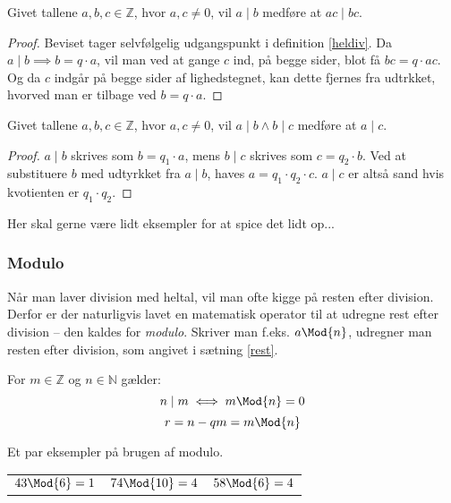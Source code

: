 \begin{sent}
    Givet tallene \(a, b, c \in \mathbb{Z}\), hvor \(a, c \neq 0\), vil \(a \mid b\) medføre at \(a c \mid b c\).
\end{sent}

\begin{proof}
    Beviset tager selvfølgelig udgangspunkt i definition \ref{heldiv}.
    Da \(a \mid b \implies b = q \cdot a\), vil man ved at gange \(c\) ind, på begge sider, blot få \(b c = q \cdot a c\).
    Og da \(c\) indgår på begge sider af lighedstegnet, kan dette fjernes fra udtrkket, hvorved man er tilbage ved \(b = q \cdot a\).
\end{proof}





\begin{sent}
    Givet tallene \(a, b, c \in \mathbb{Z}\), hvor \(a, c \neq 0\), vil \(a \mid b \land b \mid c\) medføre at \(a \mid c\).
\end{sent}

\begin{proof}
    \(a \mid b\) skrives som \(b = q_1 \cdot a\), mens \(b \mid c\) skrives som \(c = q_2 \cdot b\). Ved at substituere \(b\) med udtyrkket fra \(a \mid b\), haves \(a = q_1 \cdot q_2 \cdot c\). \(a \mid c\) er altså sand hvis kvotienten er \(q_1 \cdot q_2\).
\end{proof}


\begin{eks}
    Her skal gerne være lidt eksempler for at spice det lidt op...
\end{eks}



\subsubsection{Modulo}
Når man laver division med heltal, vil man ofte kigge på resten efter division.
Derfor er der naturligvis lavet en matematisk operator til at udregne rest efter division -- den kaldes for \emph{modulo}.
Skriver man f.eks. \(a \Mod{n}\), udregner man resten efter division, som angivet i sætning \ref{rest}.

\begin{definition}
    For \(m \in \mathbb{Z}\) og \(n \in \mathbb{N}\) gælder:
    \[n \mid m \iff m \Mod{n} = 0\]
    \[r = n - q m = m \Mod{n}\]\cite[72]{krypto}
\end{definition}

\begin{eks}
    Et par eksempler på brugen af modulo.
    \begin{center}
        \setlength{\tabcolsep}{20pt} %
        \begin{tabular}{l c r}
            \(43 \Mod{6} = 1\) & \(74 \Mod{10} = 4\) & \(58 \Mod{6} = 4\)
        \end{tabular}
    \end{center}
\end{eks}



